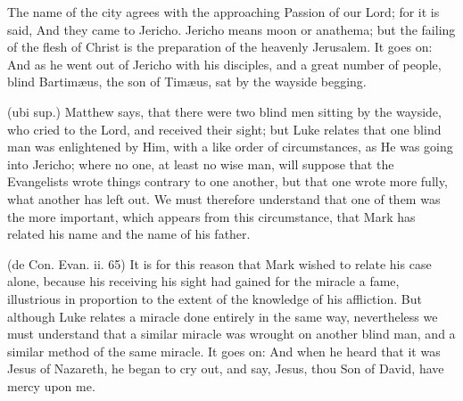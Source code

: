  

 The name of the city agrees with the approaching Passion of our Lord; for it is said, And they came to Jericho. Jericho means moon or anathema; but the failing of the flesh of Christ is the preparation of the heavenly Jerusalem. It goes on: And as he went out of Jericho with his disciples, and a great number of people, blind Bartimæus, the son of Timæus, sat by the wayside begging.

 (ubi sup.) Matthew says, that there were two blind men sitting by the wayside, who cried to the Lord, and received their sight; but Luke relates that one blind man was enlightened by Him, with a like order of circumstances, as He was going into Jericho; where no one, at least no wise man, will suppose that the Evangelists wrote things contrary to one another, but that one wrote more fully, what another has left out. We must therefore understand that one of them was the more important, which appears from this circumstance, that Mark has related his name and the name of his father.

 (de Con. Evan. ii. 65) It is for this reason that Mark wished to relate his case alone, because his receiving his sight had gained for the miracle a fame, illustrious in proportion to the extent of the knowledge of his affliction. But although Luke relates a miracle done entirely in the same way, nevertheless we must understand that a similar miracle was wrought on another blind man, and a similar method of the same miracle. It goes on: And when he heard that it was Jesus of Nazareth, he began to cry out, and say, Jesus, thou Son of David, have mercy upon me.

